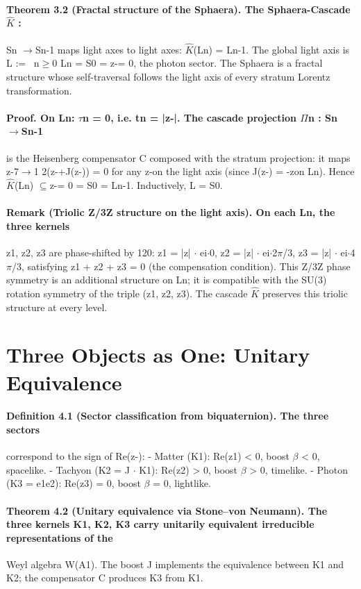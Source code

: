 \paragraph*{Theorem 3.2 (Fractal structure of the Sphaera). The Sphaera-Cascade $\hat K$ :}
Sn $\to$Sn-1 maps light axes to light axes: $\hat K$(Ln) = Ln-1. The global light axis is L := \ n$\geq$0 Ln = S0 = {z-= 0}, the photon sector. The Sphaera is a fractal structure whose self-traversal follows the light axis of every stratum Lorentz transformation.
\paragraph*{Proof. On Ln: $\tau$n = 0, i.e. tn = |z-|. The cascade projection $\Pi$n : Sn $\to$Sn-1}
is the Heisenberg compensator C composed with the stratum projection: it maps z-7$\to$1 2(z-+J(z-)) = 0 for any z-on the light axis (since J(z-) = -zon Ln). Hence $\hat K$(Ln) $\subseteq${z-= 0} = S0 = Ln-1. Inductively, L = S0.
\paragraph*{Remark (Triolic Z/3Z structure on the light axis). On each Ln, the three kernels}
z1, z2, z3 are phase-shifted by 120: z1 = |z| $\cdot$ ei$\cdot$0, z2 = |z| $\cdot$ ei$\cdot$2$\pi$/3, z3 = |z| $\cdot$ ei$\cdot$4$\pi$/3, satisfying z1 + z2 + z3 = 0 (the compensation condition). This Z/3Z phase symmetry is an additional structure on Ln; it is compatible with the SU(3) rotation symmetry of the triple (z1, z2, z3). The cascade $\hat K$ preserves this triolic structure at every level.

\section{Three Objects as One: Unitary Equivalence}
\paragraph*{Definition 4.1 (Sector classification from biquaternion). The three sectors}
correspond to the sign of Re(z-):
- Matter (K1): Re(z1) < 0, boost $\beta$ < 0, spacelike.
- Tachyon (K2 = J $\cdot$ K1): Re(z2) > 0, boost $\beta$ > 0, timelike.
- Photon (K3 = e1e2): Re(z3) = 0, boost $\beta$ = 0, lightlike.
\paragraph*{Theorem 4.2 (Unitary equivalence via Stone--von Neumann). The three kernels K1, K2, K3 carry unitarily equivalent irreducible representations of the}
Weyl algebra W(A1). The boost J implements the equivalence between K1 and K2; the compensator C produces K3 from K1.
